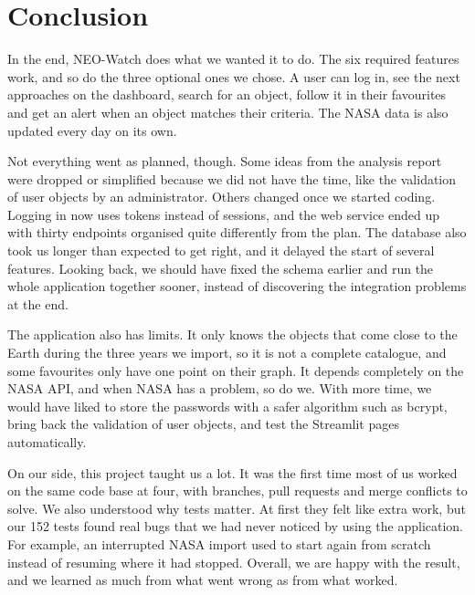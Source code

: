 \section{Conclusion}
\label{sec:conclusion}

In the end, NEO-Watch does what we wanted it to do. The six required features work, and so do
the three optional ones we chose. A user can log in, see the next approaches on the dashboard,
search for an object, follow it in their favourites and get an alert when an object matches their
criteria. The NASA data is also updated every day on its own.

Not everything went as planned, though. Some ideas from the analysis report were dropped or
simplified because we did not have the time, like the validation of user objects by an
administrator. Others changed once we started coding. Logging in now uses tokens instead of sessions, and the
web service ended up with thirty endpoints organised quite differently from the plan. The database also took us longer than expected to get right, and it
delayed the start of several features. Looking back, we should have fixed the schema earlier and
run the whole application together sooner, instead of discovering the integration problems at
the end.

The application also has limits. It only knows the objects that come close to the Earth during
the three years we import, so it is not a complete catalogue, and some favourites only have one
point on their graph. It depends completely on the NASA API, and when NASA has a problem, so do
we. With more time, we would have liked to store the passwords with a safer algorithm such as
bcrypt, bring back the validation of user objects, and test the Streamlit pages automatically.

On our side, this project taught us a lot. It was the first time most of us worked on the same
code base at four, with branches, pull requests and merge conflicts to solve. We also understood
why tests matter. At first they felt like extra work, but our 152 tests found real bugs that we had
never noticed by using the application. For example, an interrupted NASA import used to start
again from scratch instead of resuming where it had stopped. Overall, we are happy with the result, and we learned as much
from what went wrong as from what worked.
